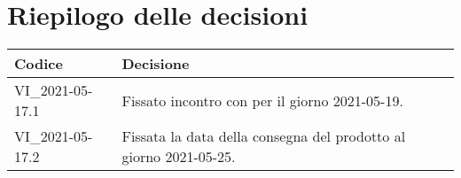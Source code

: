\section{Riepilogo delle decisioni}
\setcounter{table}{-1}
{

\centering
\renewcommand{\arraystretch}{1.5}
\begin{longtable}{>{\centering}p{} >{}p{}}
\rowcolor{azzurro1}
\textbf{Codice} &
\centerline{\textbf{Decisione}}\\
\endhead

VI{\_}2021-05-17.1 & Fissato incontro con \proponProg{} per il giorno 2021-05-19.\\
VI{\_}2021-05-17.2 & Fissata la data della consegna del prodotto al giorno 2021-05-25.\\
\end{longtable}
}